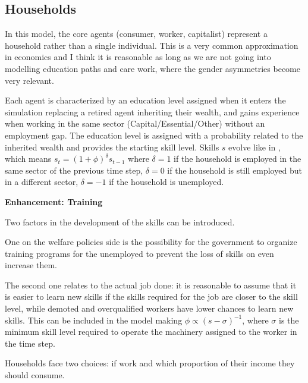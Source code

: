 \documentclass[a4paper, headings=standardclasses]{scrartcl}
\newenvironment{enh}[1][]{\begin{framed}\noindent\textbf{Enhancement: #1}\par}{\end{framed}}
\begin{document}
\subsection{Households}
In this model, the core agents (consumer, worker, capitalist) represent a household rather than a single individual. This is a very common approximation in economics and I think it is reasonable as long as we are not going into modelling education paths and care work, where the gender asymmetries become very relevant.

Each agent is characterized by an education level assigned when it enters the simulation replacing a retired agent inheriting their wealth, and gains experience when working in the same sector (Capital/Essential/Other) without an employment gap.
The education level is assigned with a probability related to the inherited wealth and provides the starting skill level.
Skills $s$ evolve like in \textcite{dosi2018}, which means $s_t = (1+\phi)^\delta s_{t-1}$ where $\delta=1$ if the household is employed in the same sector of the previous time step, $\delta=0$ if the household is still employed but in a different sector, $\delta=-1$ if the household is unemployed.

\begin{enh}[Training]
	Two factors in the development of the skills can be introduced.

	One on the welfare policies side is the possibility for the government to organize training programs for the unemployed to prevent the loss of skills on even increase them.

	The second one relates to the actual job done: it is reasonable to assume that it is easier to learn new skills if the skills required for the job are closer to the skill level, while demoted and overqualified workers have lower chances to learn new skills. This can be included in the model making $\phi \propto (s-\sigma)^{-1}$, where $\sigma$ is the minimum skill level required to operate the machinery assigned to the worker in the time step.
\end{enh}

Households face two choices: if work and which proportion of their income they should consume.
\end{document}

